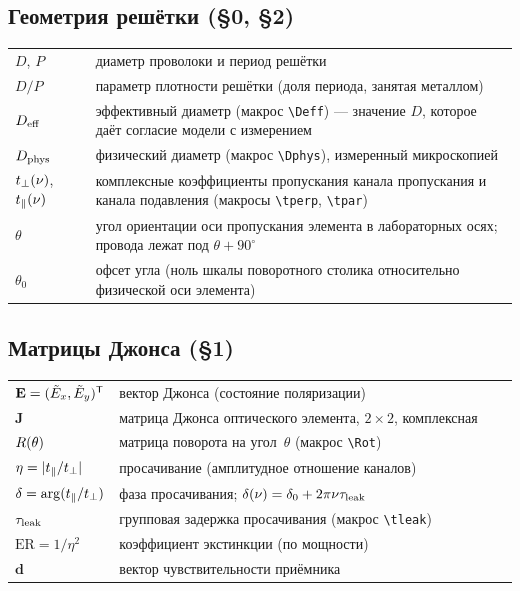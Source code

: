 \subsection*{Геометрия решётки (§0, §2)}
\begin{center}
\footnotesize
\setlength{\tabcolsep}{6pt}
\begin{tabular}{@{}p{0.16\linewidth}p{0.84\linewidth}@{}}
\toprule
$D$, $P$ & диаметр проволоки и период решётки \\
$D/P$ & параметр плотности решётки (доля периода, занятая металлом) \\
$D_{\mathrm{eff}}$ & эффективный диаметр (макрос \texttt{\textbackslash Deff}) — значение $D$, которое
даёт согласие модели с измерением \\
$D_{\mathrm{phys}}$ & физический диаметр (макрос \texttt{\textbackslash Dphys}), измеренный микроскопией \\
$t_{\perp}(\nu)$, $t_{\parallel}(\nu)$ & комплексные коэффициенты пропускания канала пропускания и канала
подавления (макросы \texttt{\textbackslash tperp}, \texttt{\textbackslash tpar}) \\
$\theta$ & угол ориентации оси пропускания элемента в лабораторных осях; провода лежат под
$\theta+90^\circ$ \\
$\theta_0$ & офсет угла (ноль шкалы поворотного столика относительно физической оси элемента) \\
\bottomrule
\end{tabular}
\end{center}

\subsection*{Матрицы Джонса (§1)}
\begin{center}
\footnotesize
\setlength{\tabcolsep}{6pt}
\begin{tabular}{@{}p{0.16\linewidth}p{0.84\linewidth}@{}}
\toprule
$\mathbf{E}=(\tilde{E}_x,\tilde{E}_y)^{\mathsf T}$ & вектор Джонса (состояние поляризации) \\
$\mathbf{J}$ & матрица Джонса оптического элемента, $2\times2$, комплексная \\
$R(\theta)$ & матрица поворота на угол~$\theta$ (макрос \texttt{\textbackslash Rot}) \\
$\eta=|t_{\parallel}/t_{\perp}|$ & просачивание (амплитудное отношение каналов) \\
$\delta=\arg(t_{\parallel}/t_{\perp})$ & фаза просачивания; $\delta(\nu)=\delta_0+2\pi\nu\tau_{\mathrm{leak}}$ \\
$\tau_{\mathrm{leak}}$ & групповая задержка просачивания (макрос \texttt{\textbackslash tleak}) \\
$\mathrm{ER}=1/\eta^2$ & коэффициент экстинкции (по мощности) \\
$\mathbf{d}$ & вектор чувствительности приёмника \\
\bottomrule
\end{tabular}
\end{center}

